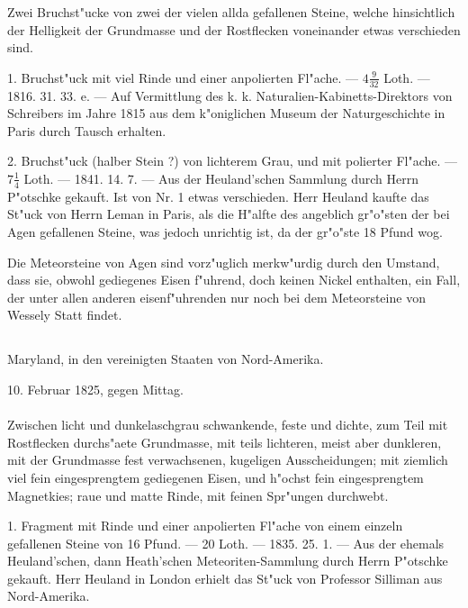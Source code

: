 \documentclass[a4paper, 11pt, oneside, polutonikogreek, german]{article}
\begin{document}
Zwei Bruchst"ucke von zwei der vielen allda gefallenen Steine, welche hinsichtlich der Helligkeit der Grundmasse und der Rostflecken voneinander etwas verschieden sind.

1. Bruchst"uck mit viel Rinde und einer anpolierten Fl"ache. --- $4\frac{9}{32}$ Loth. --- 1816. 31. 33. e. --- Auf Vermittlung des k. k. Naturalien-Kabinetts-Direktors von Schreibers im Jahre 1815 aus dem k"oniglichen Museum der Naturgeschichte in Paris durch Tausch erhalten.

2. Bruchst"uck (halber Stein ?) von lichterem Grau, und mit polierter Fl"ache. --- $7\frac{1}{4}$ Loth. --- 1841. 14. 7. --- Aus der Heuland'schen Sammlung durch Herrn P"otschke gekauft. Ist von Nr. 1 etwas verschieden. Herr Heuland kaufte das St"uck von Herrn Leman in Paris, als die H"alfte des angeblich gr"o"sten der bei Agen gefallenen Steine, was jedoch unrichtig ist, da der gr"o"ste 18 Pfund wog.

\setlength{\leftskip}{10mm}
\setlength{\parindent}{0pt}

{\footnotesize Die Meteorsteine von Agen sind vorz"uglich merkw"urdig durch den Umstand, dass sie, obwohl gediegenes Eisen f"uhrend, doch keinen Nickel enthalten, ein Fall, der unter allen anderen eisenf"uhrenden nur noch bei dem Meteorsteine von Wessely Statt findet.}

\setlength{\leftskip}{0pt}
\setlength{\parindent}{20pt}

\subsection{}
\begin{center}

Maryland, in den vereinigten Staaten von Nord-Amerika.

10. Februar 1825, gegen Mittag.
\end{center}
\paragraph{}
Zwischen licht und dunkelaschgrau schwankende, feste und dichte, zum Teil mit Rostflecken durchs"aete Grundmasse, mit teils lichteren, meist aber dunkleren, mit der Grundmasse fest verwachsenen, kugeligen Ausscheidungen; mit ziemlich viel fein eingesprengtem gediegenen Eisen, und h"ochst fein eingesprengtem Magnetkies; raue und matte Rinde, mit feinen Spr"ungen durchwebt.

1. Fragment mit Rinde und einer anpolierten Fl"ache von einem einzeln gefallenen Steine von 16 Pfund. --- 20 Loth. --- 1835. 25. 1. --- Aus der ehemals Heuland'schen, dann Heath'schen Meteoriten-Sammlung durch Herrn P"otschke gekauft. Herr Heuland in London erhielt das St"uck von Professor Silliman aus Nord-Amerika.
\end{document}
